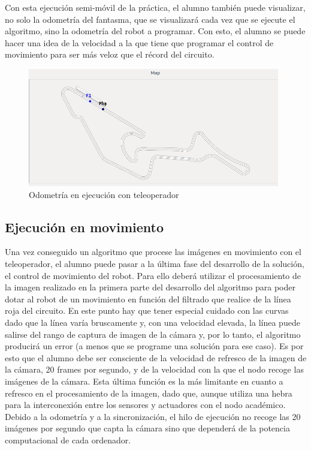 Con esta ejecución semi-móvil de la práctica, el alumno también puede visualizar, no solo la odometría del fantasma, que se visualizará cada vez que se ejecute el algoritmo, sino la odometría del robot a programar. Con esto, el alumno se puede hacer una idea de la velocidad a la que tiene que programar el control de movimiento para ser más veloz que el récord del circuito.

\begin{figure}[H]
  \begin{center}
    \includegraphics[width=0.98\textwidth]{figures/odom_semiestat_chrono.png}
		\caption{Odometría en ejecución con teleoperador}
		\label{fig.oet}
		\end{center}
\end{figure}

\subsection{Ejecución en movimiento}
Una vez conseguido un algoritmo que procese las imágenes en movimiento con el teleoperador, el alumno puede pasar a la última fase del desarrollo de la solución, el control de movimiento del robot. Para ello deberá utilizar el procesamiento de la imagen realizado en la primera parte del desarrollo del algoritmo para poder dotar al robot de un movimiento en función del filtrado que realice de la línea roja del circuito.
En este punto hay que tener especial cuidado con las curvas dado que la línea varía bruscamente y, con una velocidad elevada, la línea puede salirse del rango de captura de imagen de la cámara y, por lo tanto, el algoritmo producirá un error (a menos que se programe una solución para ese caso). Es por esto que el alumno debe ser consciente de la velocidad de refresco de la imagen de la cámara, 20 frames por segundo, y de la velocidad con la que el nodo recoge las imágenes de la cámara. Esta última función es la más limitante en cuanto a refresco en el procesamiento de la imagen, dado que, aunque utiliza una hebra para la interconexión entre los sensores y actuadores con el nodo académico. Debido a la odometría y a la sincronización, el hilo de ejecución no recoge las 20 imágenes por segundo que capta la cámara sino que dependerá de la potencia computacional de cada ordenador.

